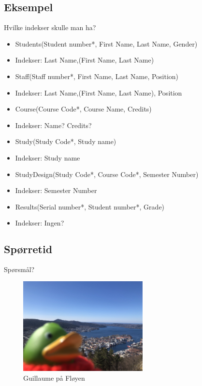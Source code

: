 \subsection*{Eksempel}
\begin{frame}{Hvilke indekser skulle man ha?}
    \begin{itemize}[<+->]
        \item Students(Student number*, First Name, Last Name, Gender)
        \item Indekser: Last Name,(First Name, Last Name)
        \item Staff(Staff number*, First Name, Last Name, Position)
        \item Indekser: Last Name,(First Name, Last Name), Position
        \item Course(Course Code*, Course Name, Credits)
        \item Indekser: Name? Credits?
        \item Study(Study Code*, Study name)
        \item Indekser: Study name
        \item StudyDesign(Study Code*, Course Code*, Semester Number)
        \item Indekser: Semester Number
        \item Results(Serial number*, Student number*, Grade)
        \item Indekser: Ingen?
    \end{itemize}
\end{frame}

\subsection*{Spørretid}
\begin{frame}{Spørsmål?}
    \begin{figure}
        \centering
        \includegraphics[height = 4.9cm]{images/guillaume10.jpg}
        \caption{Guillaume på Fløyen}
        \label{fig:guillaume10}
    \end{figure}
\end{frame}
